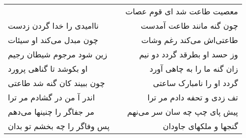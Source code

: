 \begin{center}
\begin{longtable}{l p{0.5cm} r}
&&
معصیت طاعت شد ای قوم عصات
\\
ناامیدی را خدا گردن زدست
&&
چون گنه مانند طاعت آمدست
\\
چون مبدل می‌کند او سیئات
&&
طاعتی‌اش می‌کند رغم وشات
\\
زین شود مرجوم شیطان رجیم
&&
وز حسد او بطرقد گردد دو نیم
\\
او بکوشد تا گناهی پرورد
&&
زان گنه ما را به چاهی آورد
\\
چون ببیند کان گنه شد طاعتی
&&
گردد او را نامبارک ساعتی
\\
اندر آ من در گشادم مر ترا
&&
تف زدی و تحفه دادم مر ترا
\\
مر جفاگر را چنینها می‌دهم
&&
پیش پای چپ چه سان سر می‌نهم
\\
پس وفاگر را چه بخشم تو بدان
&&
گنجها و ملکهای جاودان
\\
\end{longtable}
\end{center}
